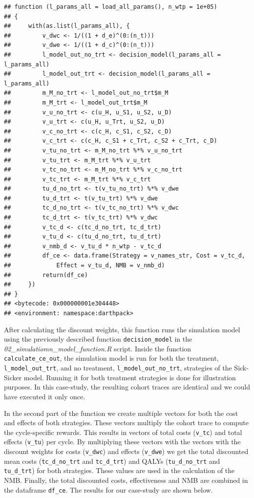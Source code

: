 \documentclass[]{book}
\begin{document}
\begin{verbatim}
## function (l_params_all = load_all_params(), n_wtp = 1e+05) 
## {
##     with(as.list(l_params_all), {
##         v_dwc <- 1/((1 + d_e)^(0:(n_t)))
##         v_dwe <- 1/((1 + d_c)^(0:(n_t)))
##         l_model_out_no_trt <- decision_model(l_params_all = l_params_all)
##         l_model_out_trt <- decision_model(l_params_all = l_params_all)
##         m_M_no_trt <- l_model_out_no_trt$m_M
##         m_M_trt <- l_model_out_trt$m_M
##         v_u_no_trt <- c(u_H, u_S1, u_S2, u_D)
##         v_u_trt <- c(u_H, u_Trt, u_S2, u_D)
##         v_c_no_trt <- c(c_H, c_S1, c_S2, c_D)
##         v_c_trt <- c(c_H, c_S1 + c_Trt, c_S2 + c_Trt, c_D)
##         v_tu_no_trt <- m_M_no_trt %*% v_u_no_trt
##         v_tu_trt <- m_M_trt %*% v_u_trt
##         v_tc_no_trt <- m_M_no_trt %*% v_c_no_trt
##         v_tc_trt <- m_M_trt %*% v_c_trt
##         tu_d_no_trt <- t(v_tu_no_trt) %*% v_dwe
##         tu_d_trt <- t(v_tu_trt) %*% v_dwe
##         tc_d_no_trt <- t(v_tc_no_trt) %*% v_dwc
##         tc_d_trt <- t(v_tc_trt) %*% v_dwc
##         v_tc_d <- c(tc_d_no_trt, tc_d_trt)
##         v_tu_d <- c(tu_d_no_trt, tu_d_trt)
##         v_nmb_d <- v_tu_d * n_wtp - v_tc_d
##         df_ce <- data.frame(Strategy = v_names_str, Cost = v_tc_d, 
##             Effect = v_tu_d, NMB = v_nmb_d)
##         return(df_ce)
##     })
## }
## <bytecode: 0x000000001e304448>
## <environment: namespace:darthpack>
\end{verbatim}

After calculating the discount weights, this function runs the simulation model using the previously described function \texttt{decision\_model} in the \emph{02\_simulatiomn\_model\_function.R} script. Inside the function \texttt{calculate\_ce\_out}, the simulation model is run for both the treatment, \texttt{l\_model\_out\_trt}, and no treatment, \texttt{l\_model\_out\_no\_trt}, strategies of the Sick-Sicker model. Running it for both treatment strategies is done for illustration purposes. In this case-study, the resulting cohort traces are identical and we could have executed it only once.

In the second part of the function we create multiple vectors for both the cost and effects of both strategies. These vectors multiply the cohort trace to compute the cycle-specific rewards. This results in vectors of total costs (\texttt{v\_tc}) and total effects (\texttt{v\_tu}) per cycle. By multiplying these vectors with the vectors with the discount weights for costs (\texttt{v\_dwc}) and effects (\texttt{v\_dwe}) we get the total discounted mean costs (\texttt{tc\_d\_no\_trt} and \texttt{tc\_d\_trt}) and QALYs (\texttt{tu\_d\_no\_trt} and \texttt{tu\_d\_trt}) for both strategies. These values are used in the calculation of the NMB. Finally, the total discounted costs, effectiveness and NMB are combined in the dataframe \texttt{df\_ce}. The results for our case-study are shown below.
\end{document}
